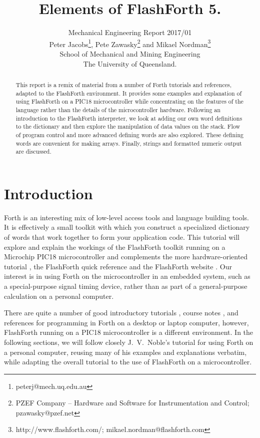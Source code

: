 \documentclass[12pt,a4paper]{article}
\title{
    Elements of FlashForth 5.
}
\author{
    Mechanical Engineering Report 2017/01\\
    Peter Jacobs\thanks{peterj@mech.uq.edu.au}, 
    Pete Zawasky\thanks{PZEF Company -- Hardware and Software for Instrumentation and Control; pzawasky@pzef.net} and 
    Mikael Nordman\thanks{http://www.flashforth.com/; mikael.nordman@flashforth.com}\\
    School of Mechanical and Mining Engineering\\
    The University of Queensland.
}
\begin{document}
\maketitle

\begin{abstract}
This report is a remix of material from a number of Forth tutorials and references, 
adapted to the FlashForth environment.
It provides some examples and explanation of using FlashForth on a PIC18 microcontroller
while concentrating on the features of the language rather than the details of the
microcontroller hardware.
Following an introduction to the FlashForth interpreter, 
we look at adding our own word definitions to the dictionary and then explore
the manipulation of data values on the stack.
Flow of program control and more advanced defining words are also explored.
These defining words are convenient for making arrays.
Finally, strings and formatted numeric output are discussed.
\end{abstract}

\newpage
\tableofcontents

\cleardoublepage
\section{Introduction}
\label{sec:introduction}
%
Forth is an interesting mix of low-level access tools and language building tools.
It is effectively a small toolkit with which you construct a specialized dictionary of words
that work together to form your application code.
This tutorial will explore and explain the workings of the FlashForth toolkit
running on a Microchip PIC18 microcontroller
and complements the more hardware-oriented tutorial \cite{jacobs_2016a},
the FlashForth quick reference \cite{jacobs_2016b} and
the FlashForth website \cite{flashforth5}.
Our interest is in using Forth on the microcontroller in an embedded system,
such as a special-purpose signal timing device,
rather than as part of a general-purpose calculation on a personal computer.

\medskip
There are quite a number of good introductory tutorials \cite{brodie_1987a,noble_2001a}, 
course notes \cite{pelc_2011a},
and references \cite{conklin_rather_2007a} 
for programming in Forth on a desktop or laptop computer,
however, FlashForth running on a PIC18 microcontroller is a different environment.
In the following sections, we will follow closely J.~V.~Noble's tutorial \cite{noble_2001a}
for using Forth on a personal computer,
reusing many of his examples and explanations verbatim, 
while adapting the overall tutorial to the use of FlashForth on a microcontroller.
\end{document}
